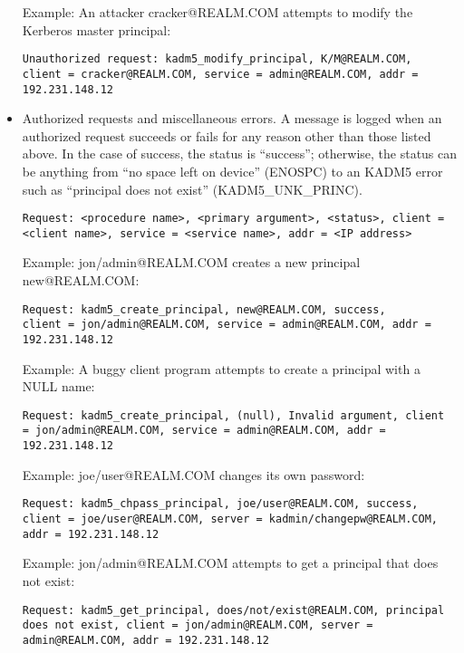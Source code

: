 \begin{itemize}
Example: An attacker cracker@REALM.COM attempts to modify the Kerberos
master principal:

\begin{verbatim}
Unauthorized request: kadm5_modify_principal, K/M@REALM.COM,
client = cracker@REALM.COM, service = admin@REALM.COM, addr =
192.231.148.12
\end{verbatim}

\item Authorized requests and miscellaneous errors.  A message is
logged when an authorized request succeeds or fails for any reason
other than those listed above.  In the case of success, the status is
``success''; otherwise, the status can be anything from ``no space
left on device'' (ENOSPC) to an KADM5 error such as ``principal
does not exist'' (KADM5_UNK_PRINC).

\begin{verbatim}
Request: <procedure name>, <primary argument>, <status>, client =
<client name>, service = <service name>, addr = <IP address>
\end{verbatim}

Example: jon/admin@REALM.COM creates a new principal new@REALM.COM:

\begin{verbatim}
Request: kadm5_create_principal, new@REALM.COM, success,
client = jon/admin@REALM.COM, service = admin@REALM.COM, addr =
192.231.148.12
\end{verbatim}

Example: A buggy client program attempts to create a principal with a
NULL name:

\begin{verbatim}
Request: kadm5_create_principal, (null), Invalid argument, client
= jon/admin@REALM.COM, service = admin@REALM.COM, addr =
192.231.148.12
\end{verbatim}

Example: joe/user@REALM.COM changes its own password:

\begin{verbatim}
Request: kadm5_chpass_principal, joe/user@REALM.COM, success,
client = joe/user@REALM.COM, server = kadmin/changepw@REALM.COM,
addr = 192.231.148.12
\end{verbatim}

Example: jon/admin@REALM.COM attempts to get a principal that does not
exist:

\begin{verbatim}
Request: kadm5_get_principal, does/not/exist@REALM.COM, principal
does not exist, client = jon/admin@REALM.COM, server =
admin@REALM.COM, addr = 192.231.148.12
\end{verbatim}

\end{itemize}

